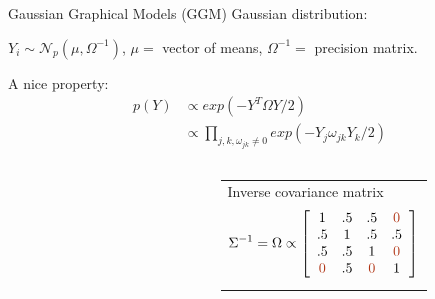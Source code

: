 \documentclass[9pt]{beamer}
\newcommand{\edgeunit}{1.5}
\newcommand{\emphase}[1]{\textcolor{Complement}{#1}}
\newcommand{\Ncal}{\mathcal{N}}
\begin{document}
\begin{frame}{Gaussian Graphical Models (GGM) }
   \emphase{Gaussian distribution:}\\
 \begin{center}
	$  Y_i \sim \Ncal_p(\mu, \Omega^{-1}) $, $\mu =$ vector of means, $\Omega^{-1} =$ precision matrix.

\end{center}
  
 
  
   \bigskip %
  \emphase{A nice property:} 
\begin{align*}
p(Y) &\propto exp(-Y^T \Omega Y /2)\\
&\propto \prod_{j,k, \omega_{jk} \neq 0 } exp(-Y_j \omega_{jk} Y_k /2)  
\end{align*}
  \begin{columns}
  \begin{column}{0.15\textwidth}
	
\end{column}
  \begin{column}{0.4\textwidth}
    \end{column}
    \begin{column}{8cm}
 
    \begin{tabular}{p{}}
	 Inverse covariance matrix
	 $$
	 \Sigma^{-1} = \Omega \propto \left[ \begin{array}{cccc}
	   1 & .5 & .5 & \emphase{0} \\
	   .5 & 1 & .5 & .5 \\
	   .5 & .5 & 1 & \emphase{0} \\
	   \emphase{0} & .5& \emphase{0}  & 1
	   \end{array} \right] 
	 $$
    \end{tabular} 
   
  \end{column}
  \end{columns}

\end{frame}
\end{document}
